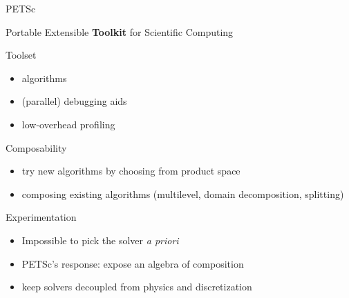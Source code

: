 \begin{frame}{PETSc}

\begin{center} Portable Extensible {\bf Toolkit} for Scientific Computing \end{center}

\begin{block}{Toolset}
  \begin{itemize}
   \item algorithms
   \item (parallel) debugging aids
   \item low-overhead profiling
  \end{itemize}
\end{block}

\begin{block}{Composability}
 \begin{itemize}
  \item try new algorithms by choosing from product space
  \item composing existing algorithms (multilevel, domain decomposition, splitting)
 \end{itemize}
\end{block}

\begin{block}{Experimentation}
\begin{itemize}
  \item Impossible to pick the solver \emph{a priori}
  \item PETSc's response: expose an algebra of composition
  \item keep solvers decoupled from physics and discretization
\end{itemize}
\end{block}

\end{frame}

